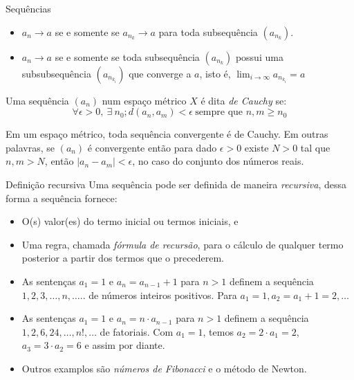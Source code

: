 \documentclass[hyperref={pdfpagelabels=false}]{beamer}
\begin{document}
\begin{frame}{Sequências}
 \begin{theorem}
  \begin{itemize}
   \item $a_n \to a$ se e somente se $a_{n_k} \to a$ para toda subsequência $(a_{n_k})$. \pause
   \item $a_n \to a$ se e somente se toda subsequência $(a_{n_k})$ possui uma subsubsequência $(a_{n_{k_i}})$ que converge a $a$, isto é, $\displaystyle \lim_{i \to \infty} a_{n_{k_i}} = a$
  \end{itemize} \pause
  
  \begin{definition}
   Uma sequência $(a_n)$ num espaço métrico $X$ é dita \emph{de Cauchy} se:
   \begin{equation*}
    \forall \epsilon >0,~\exists~ n_0; d(a_n,a_m)< \epsilon~\text{sempre que }n,m\geq n_0
   \end{equation*}

  \end{definition} \pause
  
  \begin{theorem}[Cauchy]
   Em um espaço métrico, toda sequência convergente é de Cauchy. Em outras palavras, se $(a_n)$ é convergente então para dado $\epsilon>0$ existe $N>0$ tal que $n,m>N$, então $|a_n - a_m| < \epsilon$, no caso do conjunto dos números reais.
  \end{theorem}

 \end{theorem}

\end{frame}

\begin{frame}{Definição recursiva}
 Uma sequência pode ser definida de maneira \emph{recursiva}, dessa forma a sequência fornece:
 \begin{itemize}
  \item O(s) valor(es) do termo inicial ou termos iniciais, e \pause
  \item Uma regra, chamada \emph{fórmula de recursão}, para o cálculo de qualquer termo posterior a partir dos termos que o precederem.
 \end{itemize} \pause
 
 \begin{example}
  \begin{itemize}
   \item As sentenças $a_1 = 1$ e $a_n = a_{n-1} + 1$ para $n > 1$ definem a sequência $1,2,3,\dots,n,\dots..$ de números inteiros positivos. \pause Para $a_1 = 1, a_2 = a_1 + 1 = 2, \dots$ \pause
   \item As sentenças $a_1 = 1$ e $a_n = n\cdot a_{n-1}$ para $n>1$ definem a sequência $1,2,6,24,\dots,n!,\dots$ de fatoriais. \pause Com $a_1 = 1$, temos $a_2 = 2 \cdot a_1 = 2$, $a_3 = 3 \cdot a_2 = 6$ e assim por diante. \pause
   \item Outros examplos são \emph{números de Fibonacci} e o método de Newton.
  \end{itemize}
 \end{example}
\end{frame}
\end{document}
